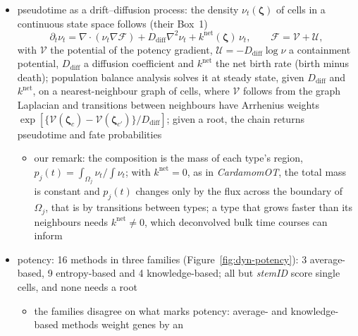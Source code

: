 \begin{itemize}
        cell cycle rather than differentiation (Teschendorff and Feinberg, 2021)
  \item pseudotime as a drift--diffusion process: the density \(\nu_{t}(\boldsymbol{\zeta})\) of cells in a continuous state space
        follows (their Box~1)
        \begin{equation}
          \partial_{t}\nu_{t}=\nabla\cdot(\nu_{t}\nabla\mathcal{F})+D_{\mathrm{diff}}\nabla^{2}\nu_{t}+k^{\mathrm{net}}(\boldsymbol{\zeta})\,\nu_{t},
          \qquad \mathcal{F}=\mathcal{V}+\mathcal{U},
          \label{eq:dyn-fokker-planck}
        \end{equation}
        with \(\mathcal{V}\) the potential of the potency gradient, \(\mathcal{U}=-D_{\mathrm{diff}}\log\nu\) a containment
        potential, \(D_{\mathrm{diff}}\) a diffusion coefficient and \(k^{\mathrm{net}}\) the net birth rate (birth minus death);
        population balance analysis solves it at steady state, given \(D_{\mathrm{diff}}\) and \(k^{\mathrm{net}}\), on a
        nearest-neighbour graph of cells, where \(\mathcal{V}\) follows from the graph Laplacian and transitions between
        neighbours have Arrhenius weights \(\exp[\{\mathcal{V}(\boldsymbol{\zeta}_{c})-\mathcal{V}(\boldsymbol{\zeta}_{c'})\}/D_{\mathrm{diff}}]\); given a root, the
        chain returns pseudotime and fate probabilities
  \begin{itemize}
    \item our remark: the composition is the mass of each type's region, \(p_{j}(t)=\int_{\Omega_{j}}\nu_{t}/\int\nu_{t}\); with
          \(k^{\mathrm{net}}=0\), as in \emph{CardamomOT}, the total mass is constant and \(p_{j}(t)\) changes only by the flux across
          the boundary of \(\Omega_{j}\), that is by transitions between types; a type that grows faster than its neighbours
          needs \(k^{\mathrm{net}}\neq0\), which deconvolved bulk time courses can inform
  \end{itemize}
  \item potency: 16 methods in three families (Figure~\ref{fig:dyn-potency}): 3 average-based, 9 entropy-based and 4
        knowledge-based; all but \emph{stemID} score single cells, and none needs a root
  \begin{itemize}
    \item the families disagree on what marks potency: average- and knowledge-based methods weight genes by an

\end{itemize}
\end{itemize}
